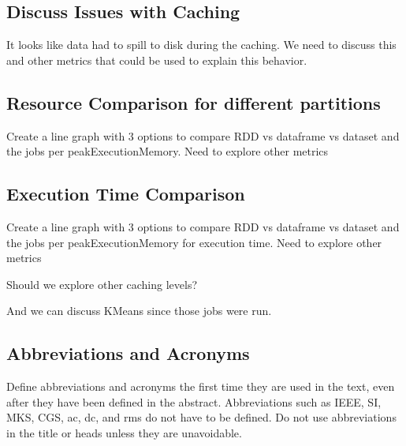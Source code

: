 \documentclass[conference]{IEEEtran}
\begin{document}
\subsection{Discuss Issues with Caching}
It looks like data had to spill to disk during the caching. We need to discuss this and other metrics that could be used
to explain this behavior.

\subsection{Resource Comparison for different partitions}
Create a line graph with 3 options to compare RDD vs dataframe vs dataset and the jobs per peakExecutionMemory.  Need to explore other metrics

\subsection{Execution Time Comparison}
Create a line graph with 3 options to compare RDD vs dataframe vs dataset and the jobs per peakExecutionMemory for execution time. Need to explore other metrics

Should we explore other caching levels?

And we can discuss KMeans since those jobs were run.
























\subsection{Abbreviations and Acronyms}\label{AA}
Define abbreviations and acronyms the first time they are used in the text, 
even after they have been defined in the abstract. Abbreviations such as 
IEEE, SI, MKS, CGS, ac, dc, and rms do not have to be defined. Do not use 
abbreviations in the title or heads unless they are unavoidable.
\end{document}
